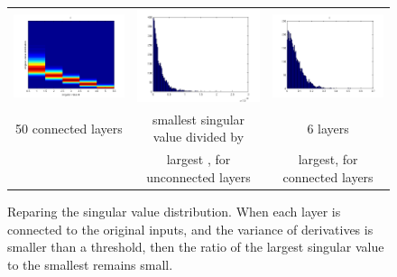 \documentclass{article}
\begin{document}
\begin{figure}
\centering
\begin{tabular}{ccc}
\includegraphics[width=0.3\columnwidth]{figures/spectrum/svd_specturm_depth_50_connected} &
\includegraphics[width=0.3\columnwidth]{figures/spectrum/svd_ratio_depth_50} &
\includegraphics[width=0.3\columnwidth]{figures/spectrum/svd_ratio_depth_50_connected} \\
50 connected layers & smallest singular value divided by & 6 layers \\
 & largest , for unconnected layers & largest, for connected layers
\end{tabular}
\caption{Reparing the singular value distribution.  When each layer is connected to the original inputs, and the variance of derivatives is smaller than a threshold, then the ratio of the largest singular value to the smallest remains small.}
\label{fig:deep_spectrum_fixed}
\end{figure}
\end{document}
